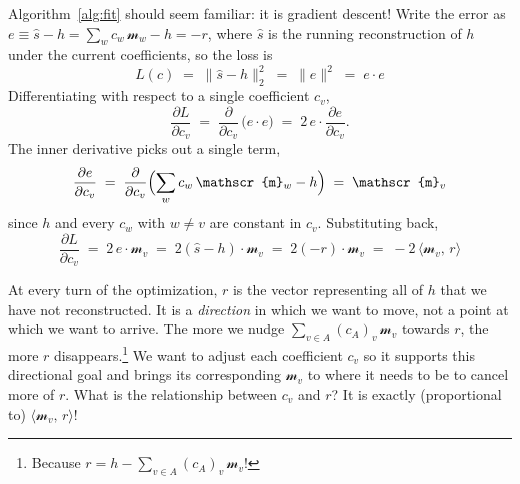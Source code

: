\documentclass{article}
\begin{document}
Algorithm~\ref{alg:fit} should seem familiar: it is gradient descent! Write the error as \(e \equiv \hat{s} - h = \sum_w c_w\, \mathscr{m}_w - h = -r\), where \(\hat{s}\) is the running reconstruction of \(h\) under the current coefficients, so the loss is
\[ L(c) \;=\; \bigl\lVert \hat{s} - h\bigr\rVert_2^2 \;=\; \lVert e\rVert^2 \;=\; e \cdot e \]
Differentiating with respect to a single coefficient \(c_v\),
\[ \frac{\partial L}{\partial c_v} \;=\; \frac{\partial}{\partial c_v}\,\bigl(e \cdot e\bigr) \;=\; 2\, e \cdot \frac{\partial e}{\partial c_v}. \]
The inner derivative picks out a single term,
\[ \frac{\partial e}{\partial c_v} \;=\; \frac{\partial}{\partial c_v}\Bigl(\sum_w c_w\, \mathscr{m}_w - h\Bigr) \;=\; \mathscr{m}_v \]
since \(h\) and every \(c_w\) with \(w \neq v\) are constant in \(c_v\). Substituting back,
\[ \frac{\partial L}{\partial c_v} \;=\; 2\, e \cdot \mathscr{m}_v \;=\; 2(\hat{s}-h)\cdot \mathscr{m}_v \;=\; 2(-r)\cdot \mathscr{m}_v \;=\; -2\,\langle \mathscr{m}_v,\, r\rangle \]

At every turn of the optimization, \(r\) is the vector representing all of \(h\) that we have not reconstructed. It is a \textit{direction} in which we want to move, not a point at which we want to arrive. The more we nudge \(\sum_{v \in A}(c_A)_v\,\mathscr{m}_{v}\) towards \(r\), the more \(r\) disappears.\footnote{Because \(r = h - \sum_{v \in A}(c_A)_v\,\mathscr{m}_{v}\)!} We want to adjust each coefficient \(c_v\) so it supports this directional goal and brings its corresponding \(\mathscr{m}_v\) to where it needs to be to cancel more of \(r\). What is the relationship between \(c_v\) and \(r\)? It is exactly (proportional to) \(\langle \mathscr{m}_v,\, r\rangle\)!
\end{document}
